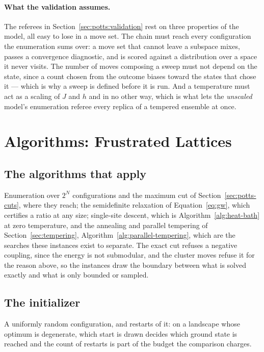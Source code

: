 \documentclass[11pt,a4paper]{article}
\begin{document}
\paragraph{What the validation assumes.}
The referees in Section~\ref{sec:potts:validation} rest on three properties of
the model, all easy to lose in a move set. The chain must reach every
configuration the enumeration sums over: a move set that cannot leave a
subspace mixes, passes a convergence diagnostic, and is scored against a
distribution over a space it never visits. The number of moves composing a
sweep must not depend on the state, since a count chosen from the outcome
biases toward the states that chose it --- which is why a sweep is defined
before it is run. And a temperature must act as a scaling of $J$ and $h$ and in
no other way, which is what lets the \emph{unscaled} model's enumeration
referee every replica of a tempered ensemble at once.

\section{Algorithms: Frustrated Lattices}
\label{sec:frustrated:algorithms}

\subsection{The algorithms that apply}
Enumeration over $2^N$ configurations and the maximum cut of
Section~\ref{sec:potts-cuts}, where they reach; the semidefinite relaxation
of Equation~\ref{eq:gw}, which certifies a ratio at any size; single-site
descent, which is Algorithm~\ref{alg:heat-bath} at zero temperature, and the
annealing and parallel tempering of Section~\ref{sec:tempering},
Algorithm~\ref{alg:parallel-tempering}, which are the searches these
instances exist to separate. The exact cut refuses a negative coupling, since the energy is
not submodular, and the cluster moves refuse it for the reason above, so the
instances draw the boundary between what is solved exactly and what is only
bounded or sampled.

\subsection{The initializer}
A uniformly random configuration, and restarts of it: on a landscape whose
optimum is degenerate, which start is drawn decides which ground state is
reached and the count of restarts is part of the budget the comparison
charges.
\end{document}
